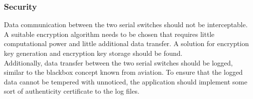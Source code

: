 \subsubsection{Security}
Data communication between the two serial switches should not be interceptable. A suitable encryption algorithm needs to be chosen that requires little computational power and little additional data transfer. A solution for encryption key generation and encryption key storage should be found.\\
Additionally, data transfer between the two serial switches should be logged, similar to the blackbox concept known from aviation. To ensure that the logged data cannot be tempered with unnoticed, the application should implement some sort of authenticity certificate to the log files.